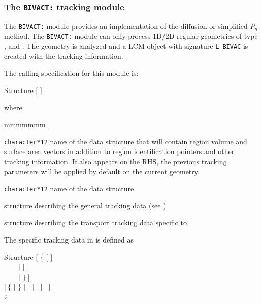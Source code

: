 \subsubsection{The {\tt BIVACT:} tracking module}\label{sect:BIVACData}

The {\tt BIVACT:} module provides an implementation of the diffusion or simplified $P_n$ method. The {\tt BIVACT:} module can only process
1D/2D regular geometries of type ,  and . The geometry is analyzed and
a LCM object with signature {\tt L\_BIVAC} is created with the tracking information.

\vskip 0.2cm

The calling specification for this module is:

\begin{DataStructure}{Structure }
\moc{:=}  $[$  $]$ 
 \moc{::}   
\end{DataStructure}

\noindent  where
\begin{ListeDeDescription}{mmmmmmm}

\item[\dusa{TRKNAM}] {\tt character*12} name of the  data
structure that will contain region volume and surface area vectors in
addition to region identification pointers and other tracking information.
If  also appears on the RHS, the previous tracking 
parameters will be applied by default on the current geometry.

\item[\dusa{GEONAM}] {\tt character*12} name of the  data
structure.

\item[\dstr{desctrack}] structure describing the general tracking data (see
)

\item[\dstr{descbivac}] structure describing the transport tracking data
specific to .

\end{ListeDeDescription}

\vskip 0.2cm

The  specific tracking data in  is defined as

\begin{DataStructure}{Structure }
$[$ $\{$  $[$   $]$ \\
~~~~$|$  $[$   $]$ \\
~~~~$|$  $\}~]$ \\
$[~\{$  $|$  $\}$ $[$  $]$  $[$   $]~[$  ~$]~]$ \\
{\tt ;}
\end{DataStructure}

